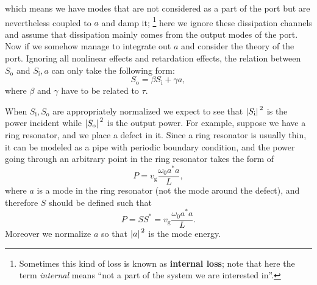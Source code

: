 \documentclass[hyperref, a4paper]{article}
\newcommand*{\concept}[1]{{\textbf{#1}}}
\newcommand*{\term}[1]{\textit{#1}}
\newcommand*{\vg}{v_{\text{g}}}
\newcommand*{\Si}{S_{\text{i}}}
\newcommand*{\So}{S_{\text{o}}}
\begin{document}
which means we have modes that are not considered as a part of the port 
but are nevertheless coupled to $a$ and damp it;%
\footnote{
    Sometimes this kind of loss is known as \concept{internal loss}; 
    note that here the term \term{internal} means ``not a part of the system we are interested in''. 
}
here we ignore these dissipation channels and assume that 
dissipation mainly comes from the output modes of the port.
Now if we somehow manage to integrate out $a$ 
and consider the theory of the port.
Ignoring all nonlinear effects and retardation effects, 
the relation between $\So$ and $\Si, a$ can only take the following form: 
\begin{equation}
    \So = \beta \Si + \gamma a, 
\end{equation}
where $\beta$ and $\gamma$ have to be related to $\tau$.

When $\Si, \So$ are appropriately normalized we expect to see that 
$\abs*{\Si}^2$ is the power incident while 
$\abs*{\So}^2$ is the output power.
For example, suppose we have a ring resonator, and we place a defect in it.
Since a ring resonator is usually thin, 
it can be modeled as a pipe with periodic boundary condition, 
and the power going through an arbitrary point in the ring resonator takes the form of 
\begin{equation}
    P = \vg \frac{\omega_0 a^* a}{L}, 
\end{equation}
where $a$ is a mode in the ring resonator (not the mode around the defect),
and therefore $S$ should be defined such that 
\begin{equation}
    P = S S^* = \vg \frac{\omega_0 a^* a}{L}.
\end{equation}
Moreover we normalize $a$ so that $\abs*{a}^2$ is the mode energy.
\end{document}
